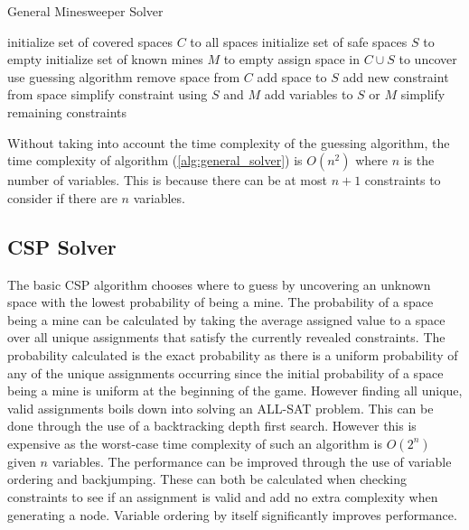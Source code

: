 \documentclass[letterpaper]{article}
\begin{document}
\begin{algorithm}[t]
\caption{General Minesweeper Solver}
\label{alg:general_solver}
\begin{algorithmic}[1]
\STATE initialize set of covered spaces $C$ to all spaces
\STATE initialize set of safe spaces $S$ to empty
\STATE initialize set of known mines $M$ to empty
		\STATE assign space in $C \cup S$ to uncover
	\ELSE
		\STATE use guessing algorithm
	\ENDIF
		\STATE remove space from $C$
		\STATE add space to $S$
		\STATE add new constraint from space
		\STATE simplify constraint using $S$ and $M$
			\STATE add variables to $S$ or $M$
		\ENDIF
		\STATE simplify remaining constraints
	\ENDIF
\ENDWHILE
\end{algorithmic}
\end{algorithm}

Without taking into account the time complexity of the guessing algorithm, the time complexity of algorithm (\ref{alg:general_solver}) is $O(n^2)$ where $n$ is the number of variables.  This is because there can be at most $n+1$ constraints to consider if there are $n$ variables.

\subsection{CSP Solver}
The basic CSP algorithm chooses where to guess by uncovering an unknown space with the lowest probability of being a mine.  The probability of a space being a mine can be calculated by taking the average assigned value to a space over all unique assignments that satisfy the currently revealed constraints.  The probability calculated is the exact probability as there is a uniform probability of any of the unique assignments occurring since the initial probability of a space being a mine is uniform at the beginning of the game.  However finding all unique, valid assignments boils down into solving an ALL-SAT problem.  This can be done through the use of a backtracking depth first search.  However this is expensive as the worst-case time complexity of such an algorithm is $O(2^n)$ given $n$ variables.  The performance can be improved through the use of variable ordering and backjumping.  These can both be calculated when checking constraints to see if an assignment is valid and add no extra complexity when generating a node.  Variable ordering by itself significantly improves performance.
\end{document}
